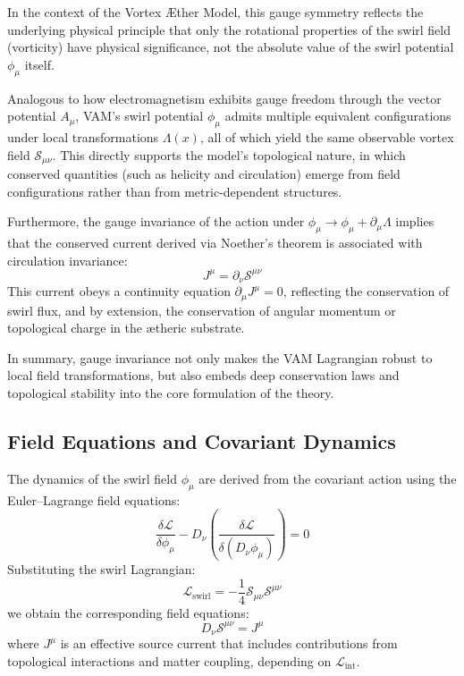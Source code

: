 \documentclass[a4paper,12pt]{article}
\begin{document}
        In the context of the Vortex Æther Model, this gauge symmetry reflects the underlying physical principle that only the
        rotational properties of the swirl field (vorticity) have physical significance, not the absolute value of the swirl potential $\phi_\mu$ itself.

        Analogous to how electromagnetism exhibits gauge freedom through the vector potential $A_\mu$, VAM's swirl potential $\phi_\mu$ admits multiple equivalent configurations under local transformations $\Lambda(x)$, all of which yield the same observable vortex field $\mathcal{S}_{\mu\nu}$. This directly supports the model's topological nature, in which conserved quantities (such as helicity and circulation) emerge from field configurations rather than from metric-dependent structures.

        Furthermore, the gauge invariance of the action under $\phi_\mu \rightarrow \phi_\mu + \partial_\mu \Lambda$ implies that the conserved current derived via Noether's theorem is associated with circulation invariance:
        \begin{equation}
            J^\mu = \partial_\nu \mathcal{S}^{\mu\nu}
        \end{equation}
        This current obeys a continuity equation $\partial_\mu J^\mu = 0$, reflecting the conservation of swirl flux, and by extension, the conservation of angular momentum or topological charge in the ætheric substrate.

        In summary, gauge invariance not only makes the VAM Lagrangian robust to local field transformations, but also embeds deep conservation laws and topological stability into the core formulation of the theory.


        \subsection{Field Equations and Covariant Dynamics}
        The dynamics of the swirl field $\phi_\mu$ are derived from the covariant action using the Euler–Lagrange field equations:
        \begin{equation}
            \frac{\delta \mathcal{L}}{\delta \phi_\mu} - D_\nu \left( \frac{\delta \mathcal{L}}{\delta (D_\nu \phi_\mu)} \right) = 0
        \end{equation}
        Substituting the swirl Lagrangian:
        \begin{equation}
            \mathcal{L}_{\text{swirl}} = -\frac{1}{4} \mathcal{S}_{\mu\nu} \mathcal{S}^{\mu\nu}
        \end{equation}
        we obtain the corresponding field equations:
        \begin{equation}
            D_\nu \mathcal{S}^{\mu\nu} = J^\mu
        \end{equation}
        where $J^\mu$ is an effective source current that includes contributions from topological interactions and matter coupling, depending on $\mathcal{L}_{\text{int}}$.
\end{document}
